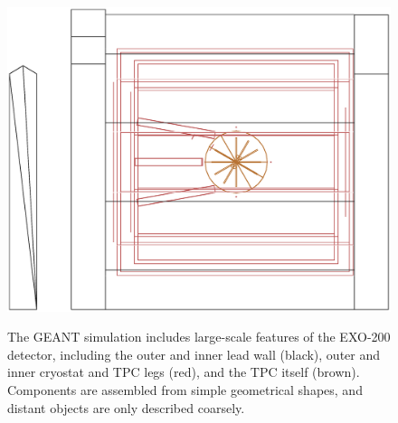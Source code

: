 \begin{figure}
\begin{center}
\includegraphics[keepaspectratio=true,width=\textwidth]{OGL_wireframe.eps}
\end{center}
\renewcommand{\baselinestretch}{1}
\small\normalsize
\begin{quote}
\caption{The GEANT simulation includes large-scale features of the EXO-200 detector, including the outer and inner lead wall (black), outer and inner cryostat and TPC legs (red), and the TPC itself (brown).  Components are assembled from simple geometrical shapes, and distant objects are only described coarsely.~\cite{MCDocumentRun2a}}
\label{fig:OGL_wireframevis}
\end{quote}
\end{figure}
\renewcommand{\baselinestretch}{2}
\small\normalsize

